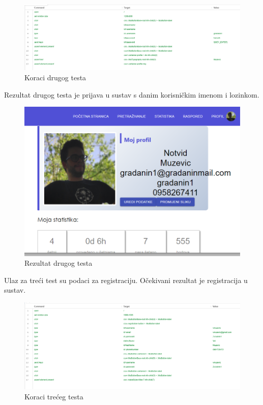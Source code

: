	\begin{figure}[H]
		\includegraphics[width=\linewidth]{slike/front-testovi-3.png}
		\centering
		\caption{Koraci drugog testa}
		\label{fig:fronttestovi3}
	\end{figure}

	\noindent \newline Rezultat drugog testa je prijava u sustav s danim korisničkim imenom i lozinkom.

	\begin{figure}[H]
		\includegraphics[width=0.8\linewidth]{slike/front-testovi-4.png}
		\centering
		\caption{Rezultat drugog testa}
		\label{fig:fronttestovi4}
	\end{figure}

	\eject

	\noindent Ulaz za treći test su podaci za registraciju. Očekivani rezultat je registracija u sustav.

	\begin{figure}[H]
		\includegraphics[width=\linewidth]{slike/front-testovi-5.png}
		\centering
		\caption{Koraci trećeg testa}
		\label{fig:fronttestovi5}
	\end{figure}

